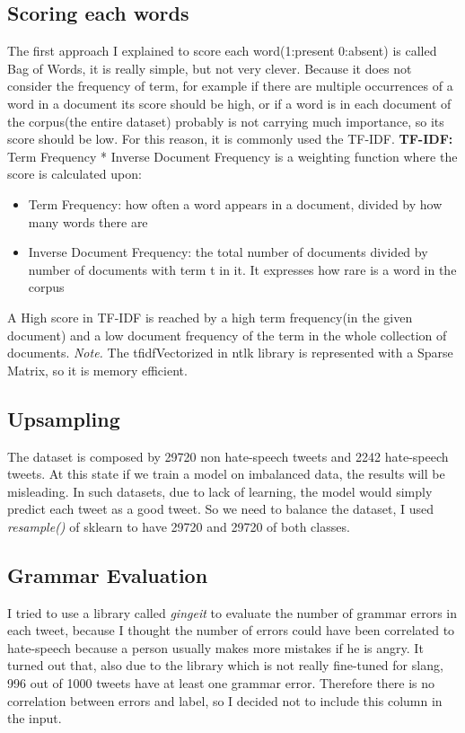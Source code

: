 \documentclass[12pt]{article}
\begin{document}
\subsection{Scoring each words}
The first approach I explained to score each word(1:present 0:absent) is called Bag of Words, it is really simple, but not very clever. Because it does not consider the frequency of term, for example if there are multiple occurrences of a word in a document its score should be high, or if a word is in each document of the corpus(the entire dataset) probably is not carrying much importance, so its score should be low.
\newline For this reason, it is commonly used the TF-IDF.
\newline
\textbf{TF-IDF: } Term Frequency * Inverse Document Frequency is a weighting function where the score is calculated upon:
\begin{itemize}
    \item Term Frequency: how often a word appears in a document, divided by how many words there are
    \item Inverse Document Frequency: the total number of documents divided by number of documents with term t in it. It expresses how rare is a word in the corpus
\end{itemize}
A High score in TF-IDF is reached by a high term frequency(in the given document) and a low document frequency of the term in the whole collection of documents.
\newline
\textit{Note.} The tfidfVectorized in ntlk library is represented with a Sparse Matrix, so it is memory efficient. 
\subsection{Upsampling}
The dataset is composed by 29720 non hate-speech tweets and 2242 hate-speech tweets. At this state if we train a model on imbalanced data, the results will be misleading. In such datasets, due to lack of learning, the model would simply predict each tweet as a good tweet.
So we need to balance the dataset, I used \textit{resample()} of sklearn to have 29720 and 29720 of both classes.
\subsection{Grammar Evaluation}
I tried to use a library called \textit{gingeit} to evaluate the number of grammar errors in each tweet, because I thought the number of errors could have been correlated to hate-speech because a person usually makes more mistakes if he is angry.
\newline
It turned out that, also due to the library which is not really fine-tuned for slang, 996 out of 1000 tweets have at least one grammar error. Therefore there is no correlation between errors and label, so I decided not to include this column in the input.
\end{document}
